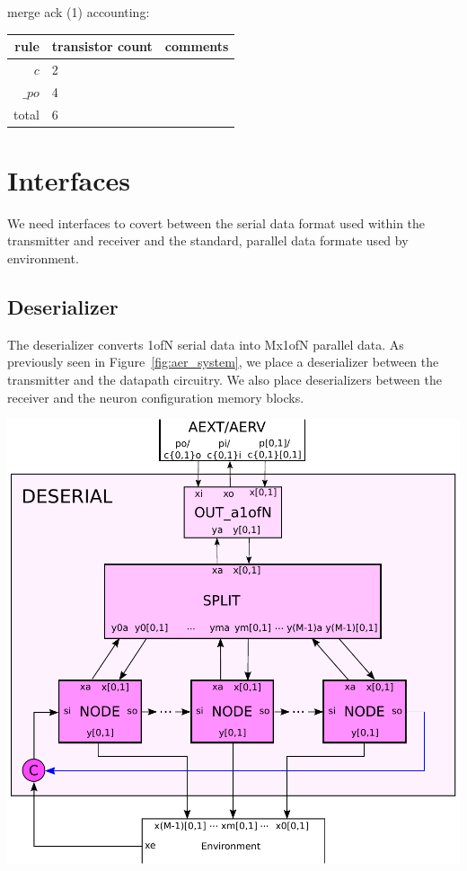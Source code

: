 \documentclass{article}
\begin{document}
\noindent
merge ack (1) accounting:

\begin{center}
    \begin{tabular}{|r|l|l|}
    \hline
    rule & transistor count & comments \\ \hline
    $c$ & 2 & \\ \hline
    $\_po$ & 4 & \\ \hline
    \hline total & 6 & \\ \hline
    \end{tabular}
\end{center}

\section{Interfaces}

We need interfaces to covert between the serial data format used within the transmitter
and receiver and the standard, parallel data formate used by environment.

\subsection{Deserializer \label{sec:DESERIAL}}

The deserializer converts 1ofN serial data into Mx1ofN parallel data.
As previously seen in Figure~\ref{fig:aer_system}, we place a deserializer 
between the transmitter and the datapath circuitry. We also place deserializers
between the receiver and the neuron configuration memory blocks.

\begin{center}
  \includegraphics[width=.45\textwidth]{img/deserial.pdf}
\end{center}
\end{document}
